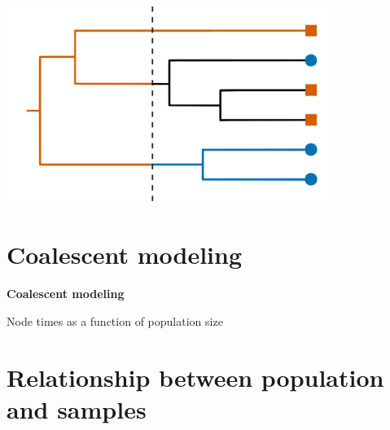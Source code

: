 \documentclass[aspectratio=169]{beamer}
\begin{document}
\begin{frame} \frametitle{\insertsection}

    \begin{center}

        \centering\includegraphics[width=0.8\textwidth]{images/tree-option3}

    \end{center}

\end{frame}


\section{Coalescent modeling}

\begin{frame} 
    \begin{center}
        \begin{huge}
    
            \textbf{Coalescent modeling}

            Node times as a function of population size

        \end{huge}
    \end{center}
\end{frame}

\section{Relationship between population and samples}
\end{document}
